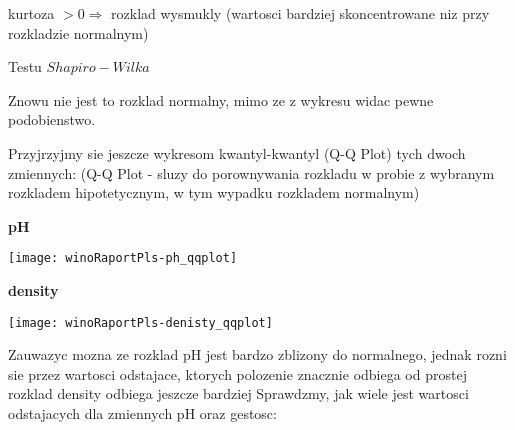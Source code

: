 \documentclass{article}
\begin{document}
kurtoza $> 0 \Rightarrow$ rozklad wysmukly (wartosci bardziej skoncentrowane niz przy 
rozkladzie normalnym)

Testu $Shapiro-Wilka$

\begin{Schunk}
\end{Schunk}

Znowu nie jest to rozklad normalny, mimo ze z wykresu widac pewne podobienstwo.



Przyjrzyjmy sie jeszcze wykresom kwantyl-kwantyl (Q-Q Plot) tych dwoch zmiennych:
(Q-Q Plot - sluzy do porownywania rozkladu w probie z wybranym rozkladem hipotetycznym, w tym wypadku rozkladem normalnym)


{\bf{pH}}

\begin{Schunk}
\end{Schunk}
\texttt{[image: winoRaportPls-ph\_qqplot]}

{\bf{density}}
\begin{Schunk}
\end{Schunk}
\texttt{[image: winoRaportPls-denisty\_qqplot]}


Zauwazyc mozna ze rozklad pH jest bardzo zblizony do normalnego, jednak 
rozni sie przez wartosci odstajace, ktorych polozenie znacznie odbiega od prostej
rozklad density odbiega jeszcze bardziej
\newline
Sprawdzmy, jak wiele jest wartosci odstajacych dla zmiennych pH oraz gestosc:
\end{document}
